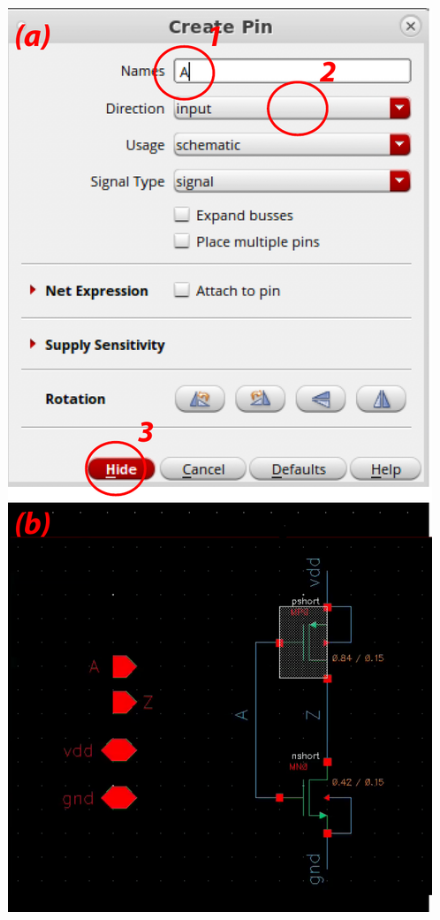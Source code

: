 \begin{enumerate}
	\parbox[t]{\dimexpr\textwidth-\leftmargin}{%
		\begin{figure}
			\vspace{-0mm}
			\centering
			\vspace{-\baselineskip}
			\includegraphics[scale=0.45]{figures/lab1_schematic_sim/pin_schematic.pdf}

\end{figure}}
\end{enumerate}
